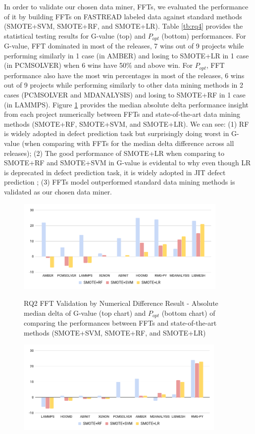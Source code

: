 \documentclass[sigconf,review, anonymous]{acmart}
\begin{document}
 In order to validate our chosen data miner, FFTs, we evaluated the performance of it by building FFTs on FASTREAD labeled data against standard methods (SMOTE+SVM, SMOTE+RF, and SMOTE+LR). Table \ref{tb:rq4} provides the statistical testing results for G-value (top) and $P_{opt}$ (bottom) performances. For G-value, FFT dominated in most of the releases, 7 wins out of 9 projects while performing similarly in 1 case (in AMBER) and losing to SMOTE+LR in 1 case (in PCMSOLVER) when 6 wins have 50\% and above win. For $P_{opt}$, FFT performance also have the most win percentages in most of the releases, 6 wins out of 9 projects while performing similarly to other data mining methods in 2 cases (PCMSOLVER and MDANALYSIS) and losing to SMOTE+RF in 1 case (in LAMMPS).  Figure \ref{fig:rq4} provides the median absolute delta performance insight from each project numerically between FFTs and state-of-the-art data mining methods (SMOTE+RF, SMOTE+SVM, and SMOTE+LR). We can see: (1) RF is widely adopted in defect prediction task but surprisingly doing worst in G-value (when comparing with FFTs for the median delta difference across all releases); (2) The good performance of SMOTE+LR when comparing to SMOTE+RF and SMOTE+SVM in G-value is evidental to why even though LR is deprecated in defect prediction task, it is widely adopted in JIT defect prediction \cite{commitguru}; (3) FFTs model outperformed standard data mining methods is validated as our chosen data miner. 

 \begin{figure}[!t]
\vspace{-10pt}
\caption{RQ2 FFT Validation by Numerical Difference Result - Absolute median delta of G-value (top chart) and $P_{opt}$ (bottom  chart) of comparing the performances between FFTs and state-of-the-art methods (SMOTE+SVM, SMOTE+RF, and SMOTE+LR)}
\includegraphics[width=\linewidth, height=1.8in]{rq4_1.png}
\label{fig:rq4}
\vspace{-25pt}
\end{figure}
\begin{figure}[!t]
\includegraphics[width=\linewidth, height=1.8in]{rq4_2.png}
\vspace{-25pt}
\end{figure}
 
\end{document}
